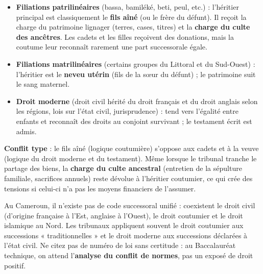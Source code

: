 \documentclass[11pt]{article}
\begin{document}
\begin{propriete}
\begin{itemize}
    \item \textbf{Filiations patrilinéaires} (bassa, bamiléké, beti, peul, etc.) : l'héritier principal est classiquement le \textbf{fils aîné} (ou le frère du défunt). Il reçoit la charge du patrimoine lignager (terres, cases, titres) et la \textbf{charge du culte des ancêtres}. Les cadets et les filles reçoivent des donations, mais la coutume leur reconnaît rarement une part successorale égale.
    \item \textbf{Filiations matrilinéaires} (certains groupes du Littoral et du Sud-Ouest) : l'héritier est le \textbf{neveu utérin} (fils de la sœur du défunt) ; le patrimoine suit le sang maternel.
    \item \textbf{Droit moderne} (droit civil hérité du droit français et du droit anglais selon les régions, lois sur l'état civil, jurisprudence) : tend vers l'égalité entre enfants et reconnaît des droits au conjoint survivant ; le testament écrit est admis.
\end{itemize}
\textbf{Conflit type} : le fils aîné (logique coutumière) s'oppose aux cadets et à la veuve (logique du droit moderne et du testament). Même lorsque le tribunal tranche le partage des biens, la \textbf{charge du culte ancestral} (entretien de la sépulture familiale, sacrifices annuels) reste dévolue à l'héritier coutumier, ce qui crée des tensions si celui-ci n'a pas les moyens financiers de l'assumer.
\end{propriete}

\begin{attention}
Au Cameroun, il n'existe pas de code successoral unifié : coexistent le droit civil (d'origine française à l'Est, anglaise à l'Ouest), le droit coutumier et le droit islamique au Nord. Les tribunaux appliquent souvent le droit coutumier aux successions « traditionnelles » et le droit moderne aux successions déclarées à l'état civil. Ne citez pas de numéro de loi sans certitude : au Baccalauréat technique, on attend l'\textbf{analyse du conflit de normes}, pas un exposé de droit positif.
\end{attention}
\end{document}
